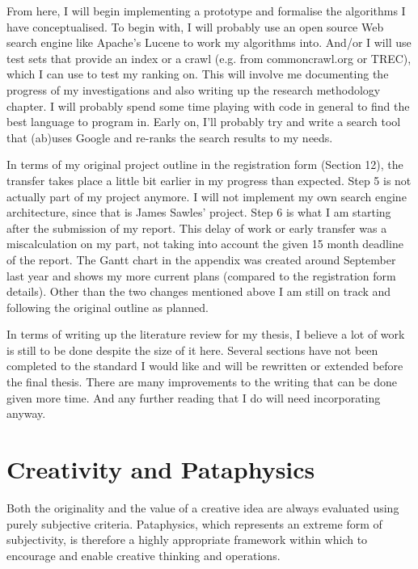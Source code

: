 From here, I will begin implementing a prototype and formalise the algorithms I have conceptualised. To begin with, I will probably use an open source Web search engine like Apache's Lucene to work my algorithms into. And/or I will use test sets that provide an index or a crawl (e.g. from commoncrawl.org or TREC), which I can use to test my ranking on.  This will involve me documenting the progress of my investigations and also writing up the research methodology chapter. I will probably spend some time playing with code in general to find the best language to program in. Early on, I'll probably try and write a search tool that (ab)uses Google and re-ranks the search results to my needs.

In terms of my original project outline in the registration form (Section 12), the transfer takes place a little bit earlier in my progress than expected. Step 5 is not actually part of my project anymore. I will not implement my own search engine architecture, since that is James Sawles' project. Step 6 is what I am starting after the submission of my report. This delay of work or early transfer was a miscalculation on my part, not taking into account the given 15 month deadline of the report. The Gantt chart in the appendix was created around September last year and shows my more current plans (compared to the registration form details). Other than the two changes mentioned above I am still on track and following the original outline as planned.

In terms of writing up the literature review for my thesis, I believe a lot of work is still to be done despite the size of it here. Several sections have not been completed to the standard I would like and will be rewritten or extended before the final thesis. There are many improvements to the writing that can be done given more time.  And any further reading that I do will need incorporating anyway.

\section{Creativity and Pataphysics}

Both the originality and the value of a creative idea are always evaluated using purely subjective criteria. Pataphysics, which represents an extreme form of subjectivity, is therefore a highly appropriate framework within which to encourage and enable creative thinking and operations.

